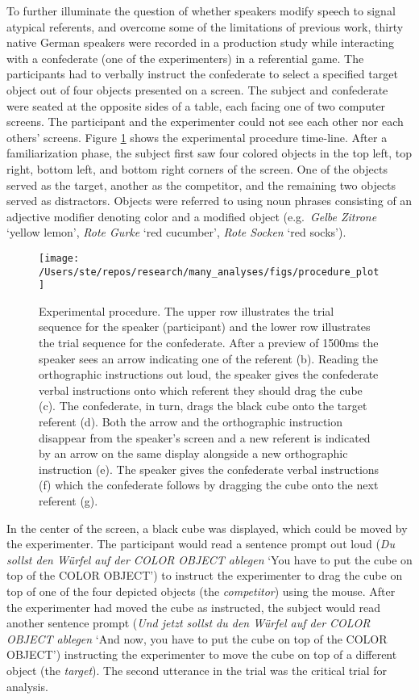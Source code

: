 \documentclass[Review,times,sageh]{sagej}
\begin{document}
To further illuminate the question of whether speakers modify speech to signal atypical referents, and overcome some of the limitations of previous work, thirty native German speakers were recorded in a production study while interacting with a confederate (one of the experimenters) in a referential game.
The participants had to verbally instruct the confederate to select a specified target object out of four objects presented on a screen.
The subject and confederate were seated at the opposite sides of a table, each facing one of two computer screens.
The participant and the experimenter could not see each other nor each others' screens.
Figure \ref{fig:procedural} shows the experimental procedure time-line.
After a familiarization phase, the subject first saw four colored objects in the top left, top right, bottom left, and bottom right corners of the screen.
One of the objects served as the target, another as the competitor, and the remaining two objects served as distractors.
Objects were referred to using noun phrases consisting of an adjective modifier denoting color and a modified object (e.g.~\emph{Gelbe Zitrone} `yellow lemon', \emph{Rote Gurke} `red cucumber', \emph{Rote Socken} `red socks').



\begin{figure}
\texttt{[image: /Users/ste/repos/research/many\_analyses/figs/procedure\_plot]} \caption{Experimental procedure. The upper row illustrates the trial sequence for the speaker (participant) and the lower row illustrates the trial sequence for the confederate. After a preview of 1500ms the speaker sees an arrow indicating one of the referent (b). Reading the orthographic instructions out loud, the speaker gives the confederate verbal instructions onto which referent they should drag the cube (c). The confederate, in turn, drags the black cube onto the target referent (d). Both the arrow and the orthographic instruction disappear from the speaker's screen and a new referent is indicated by an arrow on the same display alongside a new orthographic instruction (e). The speaker gives the confederate verbal instructions (f) which the confederate follows by dragging the cube onto the next referent (g).}\label{fig:procedural}
\end{figure}

In the center of the screen, a black cube was displayed, which could be moved by the experimenter.
The participant would read a sentence prompt out loud (\emph{Du sollst den Würfel auf der COLOR OBJECT ablegen} `You have to put the cube on top of the COLOR OBJECT') to instruct the experimenter to drag the cube on top of one of the four depicted objects (the \emph{competitor}) using the mouse.
After the experimenter had moved the cube as instructed, the subject would read another sentence prompt (\emph{Und jetzt sollst du den Würfel auf der COLOR OBJECT ablegen} `And now, you have to put the cube on top of the COLOR OBJECT') instructing the experimenter to move the cube on top of a different object (the \emph{target}).
The second utterance in the trial was the critical trial for analysis.
\end{document}
